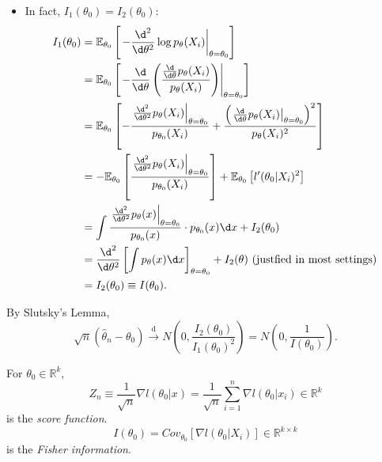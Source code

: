 \documentclass[a4paper]{article}
\begin{document}
\begin{itemize}
\begin{equation}
	\end{equation}
	\item In fact, $I_1(\theta_0) = I_2(\theta_0)$:
	\begin{equation}
		\begin{aligned}
			I_1(\theta_0) &= \mathbb{E}_{\theta_0}\left[\left.-\frac{\d^2}{\d \theta^2} \log p_{\theta}(X_i) \right |_{\theta = \theta_0} \right] \\
			&= \mathbb{E}_{\theta_0}\left[\left.-\frac{\d}{\d \theta}\left(\frac{\frac{\d}{\d \theta} p_{\theta}(X_i)}{p_{\theta}(X_i)}\right) \right|_{\theta = \theta_0}\right] \\
			&= \mathbb{E}_{\theta_0}\left[-\frac{\left.\frac{\d^2}{\d \theta^2} p_{\theta}(X_i)\right |_{\theta = \theta_0}}{p_{\theta_0}(X_i)} + \frac{\left( \left. \frac{\d}{\d \theta} p_{\theta}(X_i) \right |_{\theta = \theta_0}\right)^2}{p_{\theta}(X_i)^2}\right] \\
			&= -\mathbb{E}_{\theta_0}\left[\frac{\left.\frac{\d^2}{\d \theta^2} p_{\theta}(X_i)\right |_{\theta = \theta_0}}{p_{\theta_0}(X_i)}\right] + \mathbb{E}_{\theta_0}\left[l'(\theta_0|X_i)^2\right] \\
			&= \int \frac{\left.\frac{\d^2}{\d \theta^2} p_{\theta}(x)\right |_{\theta = \theta_0}}{p_{\theta_0}(x)} \cdot p_{\theta_0}(x) \d x + I_2(\theta_0)\\
			&= \frac{\d^2}{\d \theta^2} \left[\int p_{\theta}(x) \d x \right]_{\theta = \theta_0} + I_2(\theta) \text{ (justfied in most settings)} \\
			&= I_2(\theta_0) \equiv I(\theta_0).
		\end{aligned}
	\end{equation}
\end{itemize}
By Slutsky's Lemma,
\begin{equation}
	\sqrt{n}(\hat{\theta}_n - \theta_0) \stackrel{\text{d}}{\longrightarrow} N(0,\frac{I_2(\theta_0)}{I_1(\theta_0)^2}) = N(0,\frac{1}{I(\theta_0)}).
\end{equation}

\begin{defi}
	For $\theta_0 \in \mathbb{R}^k$,
	\begin{equation}
		Z_n \equiv \frac{1}{\sqrt{n}} \nabla l(\theta_0|x) = \frac{1}{\sqrt{n}} \sum\limits_{i=1}^n \nabla l(\theta_0|x_i) \in \mathbb{R}^k
	\end{equation}
	is the \emph{score function}.
	\begin{equation}
		I(\theta_0) = Cov_{\theta_0}[\nabla l(\theta_0|X_i)] \in \mathbb{R}^{k \times k}
	\end{equation}
	is the \emph{Fisher information}.
\end{defi}
\end{document}
